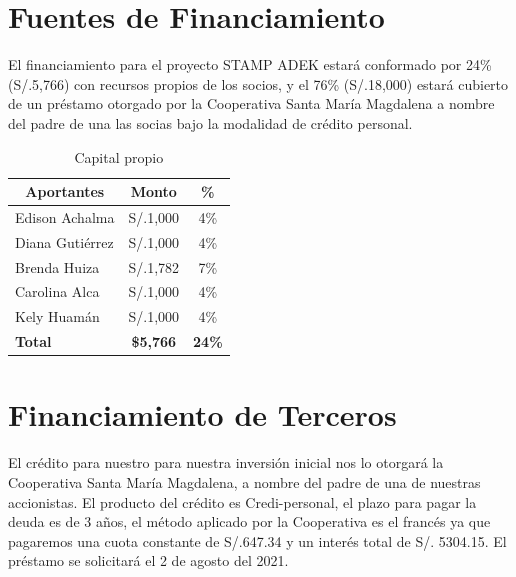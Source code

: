 \documentclass[a4paper,openright,12pt]{book}
\begin{document}
\section{Fuentes de Financiamiento}

El financiamiento para el proyecto STAMP ADEK estará conformado por 24\% (S/.5,766) con recursos propios de los socios, y el 76\% (S/.18,000) estará cubierto de un préstamo otorgado por la Cooperativa Santa María Magdalena a nombre del padre de una las socias bajo la modalidad de crédito personal.

\begin{table}[H]
\centering
\begin{tabular}{lcc}
\hline
\multicolumn{1}{c}{\textbf{Aportantes}} & \textbf{Monto}   & \textbf{\%}   \\ \hline
Edison   Achalma                        & S/.1,000         & 4\%           \\
Diana   Gutiérrez                       & S/.1,000         & 4\%           \\
Brenda   Huiza                          & S/.1,782         & 7\%           \\
Carolina   Alca                         & S/.1,000         & 4\%           \\
Kely   Huamán                           & S/.1,000         & 4\%           \\ \hline
\textbf{Total}                          & \textbf{\$5,766} & \textbf{24\%} \\ \hline
\end{tabular}
\caption{Capital propio}
\label{Tabla11}
\end{table}

\section{Financiamiento de Terceros}

El crédito para nuestro para nuestra inversión inicial nos lo otorgará la Cooperativa Santa María Magdalena, a nombre del padre de una de nuestras accionistas. El producto del crédito es Credi-personal, el plazo para pagar la deuda es de 3 años, el método aplicado por la Cooperativa es el francés ya que pagaremos una cuota constante de S/.647.34 y un interés total de S/. 5304.15. El préstamo se solicitará el 2 de agosto del 2021.
\end{document}
